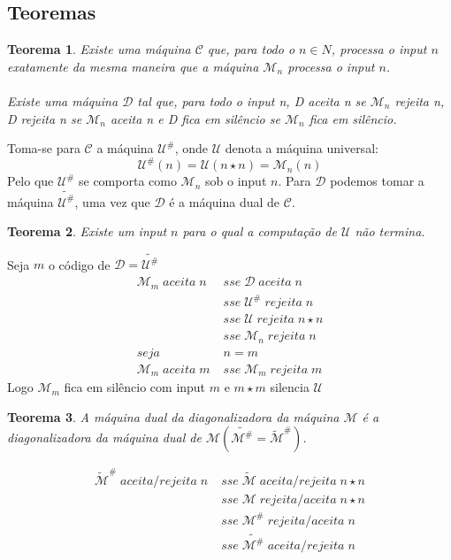 \documentclass[10pt,a4paper]{report}
\newtheorem{theorem}{Teorema}
\begin{document}
\subsection{Teoremas}
\begin{theorem}
Existe uma máquina $\mathcal{C}$ que, para todo o $n \in N$, processa o input $n$ exatamente da mesma maneira que a
máquina $\mathcal{M}_n$ processa o input $n$.\\
\\
Existe uma máquina $\mathcal{D}$ tal que, para todo o input n, D aceita n se $\mathcal{M}_n$ rejeita n, D rejeita n se $\mathcal{M}_n$ aceita n e D fica em silêncio se $\mathcal{M}_n$ fica em silêncio.
\end{theorem}
Toma-se para $\mathcal{C}$ a máquina $\mathcal{U}^\#$, onde $\mathcal{U}$ denota a máquina universal:
$$
\mathcal{U}^\#(n) = \mathcal{U}(n \star n) = \mathcal{M}_n(n)
$$
Pelo que $\mathcal{U}^\#$ se comporta como $\mathcal{M}_n$ sob o input $n$. Para $\mathcal{D}$ podemos tomar a máquina $\widetilde{\mathcal{U}^\#}$, uma vez que $\mathcal{D}$ é a máquina dual de $\mathcal{C}$.
\begin{theorem}
Existe um input $n$ para o qual a computação de $\mathcal{U}$ não termina.
\end{theorem}
Seja $m$ o código de $\mathcal{D} = \widetilde{\mathcal{U}^\#}$
\begin{align}
\mathcal{M}_m \; aceita \; n \; &sse \; \mathcal{D} \; aceita \; n\\
&sse \; \mathcal{U}^\# \; rejeita \; n\\
&sse \; \mathcal{U} \; rejeita \; n\star n\\
&sse \; \mathcal{M}_n \; rejeita \; n\\
seja \; &n = m\\
\mathcal{M}_m \; aceita \; m \; &sse \; \mathcal{M}_m \; rejeita \; m
\end{align}
Logo $\mathcal{M}_m$ fica em silêncio com input $m$ e $m \star m$ silencia $\mathcal{U}$
\begin{theorem}
A máquina dual da diagonalizadora da máquina $\mathcal{M}$ é a diagonalizadora da máquina dual de $\mathcal{M} (\widetilde{\mathcal{M}^\#} = \widetilde{\mathcal{M}}^\#)$.
\end{theorem}
\begin{align}
\widetilde{\mathcal{M}}^\# \; aceita / rejeita \; n \; &sse \; \widetilde{\mathcal{M}} \; aceita / rejeita \; n \star n\\
&sse \; \mathcal{M} \; rejeita / aceita \; n\star n\\
&sse \; \mathcal{M}^\# \; rejeita / aceita \; n\\
&sse \; \widetilde{\mathcal{M}^\#} \; aceita / rejeita \; n
\end{align}
\end{document}
